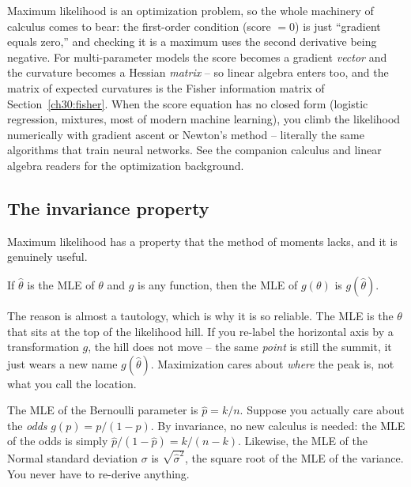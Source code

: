\begin{connectionbox}
Maximum likelihood is an optimization problem, so the whole machinery of
calculus comes to bear: the first-order condition (score $=0$) is just
``gradient equals zero,'' and checking it is a maximum uses the second
derivative being negative. For multi-parameter models the score becomes a
gradient \emph{vector} and the curvature becomes a Hessian \emph{matrix} -- so
linear algebra enters too, and the matrix of expected curvatures is the Fisher
information matrix of Section~\ref{ch30:fisher}. When the score equation has no
closed form (logistic regression, mixtures, most of modern machine learning),
you climb the likelihood numerically with gradient ascent or Newton's method --
literally the same algorithms that train neural networks. See the companion
calculus and linear algebra readers for the optimization background.
\end{connectionbox}

\subsection{The invariance property}
\label{ch30:invariance}

Maximum likelihood has a property that the method of moments lacks, and it is
genuinely useful.

\begin{theorem}
\label{ch30:thm-invariance}
If $\hat\theta$ is the MLE of $\theta$ and $g$ is any function, then the MLE of
$g(\theta)$ is $g(\hat\theta)$.
\end{theorem}

\begin{whybox}
The reason is almost a tautology, which is why it is so reliable. The MLE is the
$\theta$ that sits at the top of the likelihood hill. If you re-label the
horizontal axis by a transformation $g$, the hill does not move -- the same
\emph{point} is still the summit, it just wears a new name $g(\hat\theta)$.
Maximization cares about \emph{where} the peak is, not what you call the
location.
\end{whybox}

\begin{example}
\label{ch30:ex-invariance}
The MLE of the Bernoulli parameter is $\hat p = k/n$. Suppose you actually care
about the \emph{odds} $g(p)=p/(1-p)$. By invariance, no new calculus is needed:
the MLE of the odds is simply $\hat p/(1-\hat p) = k/(n-k)$. Likewise, the MLE
of the Normal standard deviation $\sigma$ is $\sqrt{\hat\sigma^2}$, the square
root of the MLE of the variance. You never have to re-derive anything.
\end{example}

